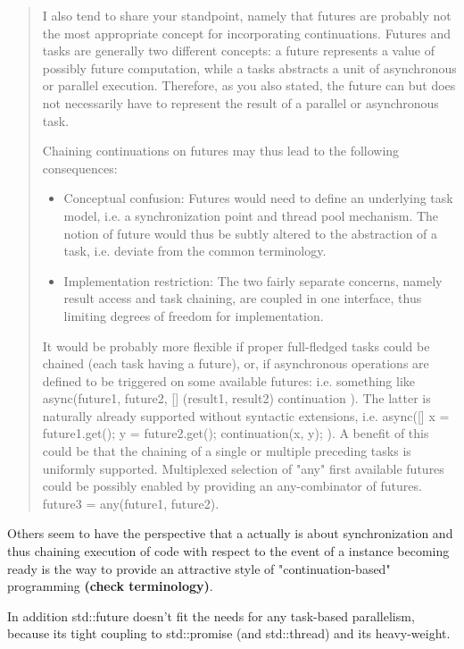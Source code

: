 \documentclass[ebook,11pt,article]{memoir}
\begin{document}
\begin{quote}
I also tend to share your standpoint, namely that futures are probably not the most appropriate concept for incorporating continuations. Futures and tasks are generally two different concepts: a future represents a value of possibly future computation, while a tasks abstracts a unit of asynchronous or parallel execution. Therefore, as you also stated, the future can but does not necessarily have to represent the result of a parallel or asynchronous task.

Chaining continuations on futures may thus lead to the following consequences:
\begin{itemize}
\item Conceptual confusion: Futures would need to define an underlying task model, i.e. a synchronization point and thread pool mechanism. The notion of future would thus be subtly altered to the abstraction of a task, i.e. deviate from the common terminology.
\item Implementation restriction: The two fairly separate concerns, namely result access and task chaining, are coupled in one interface, thus limiting degrees of freedom for implementation. 

\end{itemize}

It would be probably more flexible if proper full-fledged tasks could be chained (each task having a future), or, if asynchronous operations are defined to be triggered on some available futures: i.e. something like async(future1, future2, [] (result1, result2) { continuation }). The latter is naturally already supported without syntactic extensions, i.e. async([]{ x = future1.get(); y = future2.get(); continuation(x, y); }). A benefit of this could be that the chaining of a single or multiple preceding tasks is uniformly supported. Multiplexed selection of "any" first available futures could be possibly enabled by providing an any-combinator of futures. future3 = any(future1, future2). 
\end{quote}

Others seem to have the perspective that a  actually is about synchronization and thus chaining execution of code with respect to the event of a  instance becoming ready is the way to provide an attractive style of "continuation-based" programming \textbf{(check terminology)}.

In addition std::future doesn't fit the needs for any task-based parallelism, because its tight coupling to std::promise (and std::thread) and its heavy-weight. 
\end{document}
